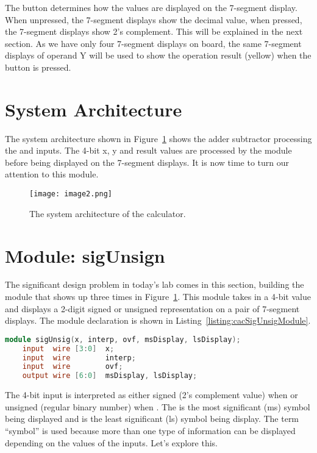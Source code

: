 The  button determines how the values are displayed on the
7-segment display. When unpressed, the 7-segment displays show the
decimal value, when pressed, the 7-segment displays show 2's complement.
This will be explained in the next section. As we have only four 7-segment displays on
board, the same 7-segment displays of operand Y will be used to show the operation
result (yellow) when the  button is pressed.

\section{System Architecture}

The system architecture shown in Figure~\ref{fig:sysArchCalc} shows the adder subtractor
processing the  and  inputs. The 4-bit x, y and result
values are processed by the  module before being displayed on the
7-segment displays. It is now time to turn our attention to this module.

\begin{figure}[ht]
\texttt{[image:  image2.png]}
\caption{The system architecture of the calculator.}
\label{fig:sysArchCalc}
\end{figure}


\section{Module: sigUnsign}

The significant design problem in today's lab comes in this section,
building the  module that shows up three times in Figure~\ref{fig:sysArchCalc}. 
This module takes in a 4-bit value and
displays a 2-digit signed or unsigned representation on a pair of
7-segment displays. The  module declaration is shown in Listing~\ref{listing:cacSigUnsigModule}.


\begin{lstlisting}[language=Verilog,
 caption={Module declaration for the sigUnsig module.},
 label={listing:cacSigUnsigModule},
 frame=single]
 module sigUnsig(x, interp, ovf, msDisplay, lsDisplay);    
    input  wire [3:0]  x;	 	 
    input  wire        interp;
    input  wire        ovf;
    output wire [6:0]  msDisplay, lsDisplay;
 \end{lstlisting}

The 4-bit input  is interpreted as either signed (2's complement
value) when  or unsigned (regular binary number) when
.  The  is the most significant (ms)
symbol being displayed and  is the least significant (ls)
symbol being display.  The term ``symbol'' is used because more than
one type of information can be displayed depending on the values
of the inputs.  Let's explore this.

